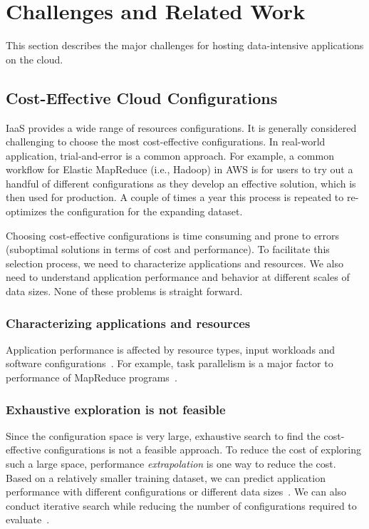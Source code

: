 \section{Challenges and Related Work}
\label{sec:ch8::challenges}


This section describes the major challenges for
hosting data-intensive applications on the cloud.

\subsection{Cost-Effective Cloud Configurations}

IaaS provides a wide range of resources configurations.
It is generally considered challenging to choose
the most cost-effective configurations.
In real-world application, trial-and-error is a common approach.
For example, a common workflow for Elastic MapReduce (i.e., Hadoop) in AWS
is for users to try out a handful of different configurations
as they develop an effective solution, which is then used for production.
A couple of times a year this process is repeated to re-optimizes
the configuration for the expanding dataset.

Choosing cost-effective configurations is time consuming and prone to
errors (suboptimal solutions in terms of cost and performance).
To facilitate this selection process, we need to
characterize applications and resources.
We also need to understand application performance and behavior
at different scales of data sizes.
None of these problems is straight forward.

\subsubsection*{Characterizing applications and resources}
Application performance is affected by
resource types, input workloads and
software configurations~\cite{Alipourfard2017}.
For example, task parallelism is a major factor to
performance of MapReduce programs~\cite{kc2015dynamically}.

\subsubsection*{Exhaustive exploration is not feasible}
Since the configuration space is very large, exhaustive search to
find the cost-effective configurations is not a feasible approach.
To reduce the cost of exploring such a large space,
performance \emph{extrapolation} is one way to reduce the cost.
Based on a relatively smaller training dataset,
we can predict application performance with different configurations or 
different data sizes~\cite{Hsu2016}.
We can also conduct iterative search while reducing the number of configurations
required to evaluate~\cite{Alipourfard2017}.


